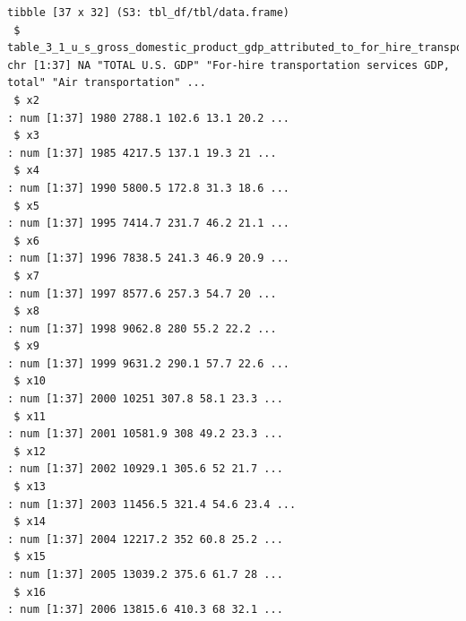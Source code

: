 \documentclass[
  letterpaper,
  DIV=11,
  numbers=noendperiod]{scrreprt}
\begin{document}
\begin{verbatim}
tibble [37 x 32] (S3: tbl_df/tbl/data.frame)
 $ table_3_1_u_s_gross_domestic_product_gdp_attributed_to_for_hire_transportation_services_billions_of_current_dollars: chr [1:37] NA "TOTAL U.S. GDP" "For-hire transportation services GDP, total" "Air transportation" ...
 $ x2                                                                                                                 : num [1:37] 1980 2788.1 102.6 13.1 20.2 ...
 $ x3                                                                                                                 : num [1:37] 1985 4217.5 137.1 19.3 21 ...
 $ x4                                                                                                                 : num [1:37] 1990 5800.5 172.8 31.3 18.6 ...
 $ x5                                                                                                                 : num [1:37] 1995 7414.7 231.7 46.2 21.1 ...
 $ x6                                                                                                                 : num [1:37] 1996 7838.5 241.3 46.9 20.9 ...
 $ x7                                                                                                                 : num [1:37] 1997 8577.6 257.3 54.7 20 ...
 $ x8                                                                                                                 : num [1:37] 1998 9062.8 280 55.2 22.2 ...
 $ x9                                                                                                                 : num [1:37] 1999 9631.2 290.1 57.7 22.6 ...
 $ x10                                                                                                                : num [1:37] 2000 10251 307.8 58.1 23.3 ...
 $ x11                                                                                                                : num [1:37] 2001 10581.9 308 49.2 23.3 ...
 $ x12                                                                                                                : num [1:37] 2002 10929.1 305.6 52 21.7 ...
 $ x13                                                                                                                : num [1:37] 2003 11456.5 321.4 54.6 23.4 ...
 $ x14                                                                                                                : num [1:37] 2004 12217.2 352 60.8 25.2 ...
 $ x15                                                                                                                : num [1:37] 2005 13039.2 375.6 61.7 28 ...
 $ x16                                                                                                                : num [1:37] 2006 13815.6 410.3 68 32.1 ...

\end{verbatim}
\end{document}
